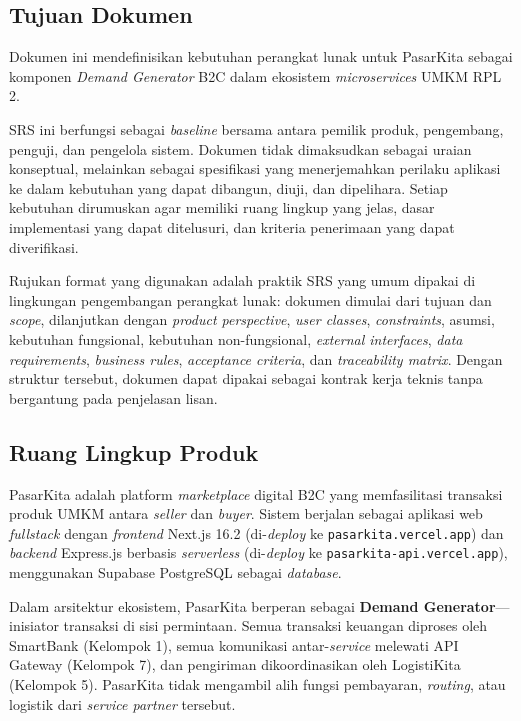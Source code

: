 
\subsection{Tujuan Dokumen}

Dokumen ini mendefinisikan kebutuhan perangkat lunak untuk PasarKita sebagai
komponen \textit{Demand Generator} B2C dalam ekosistem \textit{microservices}
UMKM RPL 2.

SRS ini berfungsi sebagai \textit{baseline} bersama antara pemilik produk,
pengembang, penguji, dan pengelola sistem. Dokumen tidak dimaksudkan sebagai
uraian konseptual, melainkan sebagai spesifikasi yang menerjemahkan perilaku
aplikasi ke dalam kebutuhan yang dapat dibangun, diuji, dan dipelihara. Setiap
kebutuhan dirumuskan agar memiliki ruang lingkup yang jelas, dasar implementasi
yang dapat ditelusuri, dan kriteria penerimaan yang dapat diverifikasi.

Rujukan format yang digunakan adalah praktik SRS yang umum dipakai di lingkungan
pengembangan perangkat lunak: dokumen dimulai dari tujuan dan \textit{scope},
dilanjutkan dengan \textit{product perspective}, \textit{user classes},
\textit{constraints}, asumsi, kebutuhan fungsional, kebutuhan non-fungsional,
\textit{external interfaces}, \textit{data requirements}, \textit{business rules},
\textit{acceptance criteria}, dan \textit{traceability matrix}. Dengan struktur
tersebut, dokumen dapat dipakai sebagai kontrak kerja teknis tanpa bergantung
pada penjelasan lisan.

\subsection{Ruang Lingkup Produk}

PasarKita adalah platform \textit{marketplace} digital B2C yang memfasilitasi
transaksi produk UMKM antara \textit{seller} dan \textit{buyer}. Sistem berjalan
sebagai aplikasi web \textit{fullstack} dengan \textit{frontend} Next.js 16.2
(di-\textit{deploy} ke \texttt{pasarkita.vercel.app}) dan \textit{backend}
Express.js berbasis \textit{serverless} (di-\textit{deploy} ke
\texttt{pasarkita-api.vercel.app}), menggunakan Supabase PostgreSQL sebagai
\textit{database}.

Dalam arsitektur ekosistem, PasarKita berperan sebagai \textbf{Demand
Generator}---inisiator transaksi di sisi permintaan. Semua transaksi keuangan
diproses oleh SmartBank (Kelompok 1), semua komunikasi antar-\textit{service}
melewati API Gateway (Kelompok 7), dan pengiriman dikoordinasikan oleh LogistiKita
(Kelompok 5). PasarKita tidak mengambil alih fungsi pembayaran, \textit{routing},
atau logistik dari \textit{service partner} tersebut.

